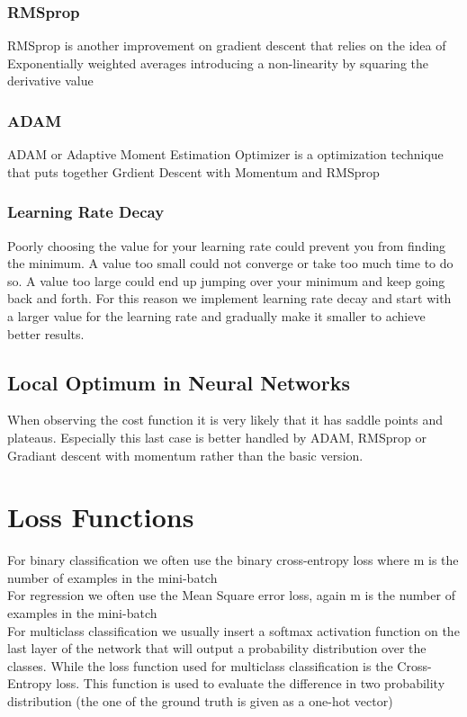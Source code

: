 \documentclass{article}
\begin{document}
\subsubsection*{RMSprop}
RMSprop is another improvement on gradient descent that relies on the idea of Exponentially weighted averages introducing a non-linearity by squaring the derivative value
\subsubsection*{ADAM}
ADAM or Adaptive Moment Estimation Optimizer is a optimization technique that puts together Grdient Descent with Momentum and RMSprop 

\subsubsection*{Learning Rate Decay}
Poorly choosing the value for your learning rate could prevent you from finding the minimum. A value too small could not converge or take too much time to do so. A value too large could end up jumping over your minimum and keep going back and forth. For this reason we implement learning rate decay and start with a larger value for the learning rate and gradually make it smaller to achieve better results.
\subsection*{Local Optimum in Neural Networks}
When observing the cost function it is very likely that it has saddle points and plateaus. Especially this last case is better handled by ADAM, RMSprop or Gradiant descent with momentum rather than the basic version.
\section{Loss Functions}
For binary classification we often use the binary cross-entropy loss where m is the number of examples in the mini-batch\\
For regression we often use the Mean Square error loss, again m is the number of examples in the mini-batch\\
For multiclass classification we usually insert a softmax activation function on the last layer of the network that will output a probability distribution over the classes. While the loss function used for multiclass classification is the Cross-Entropy loss. This function is used to evaluate the difference in two probability distribution (the one of the ground truth is given as a one-hot vector)
\end{document}
